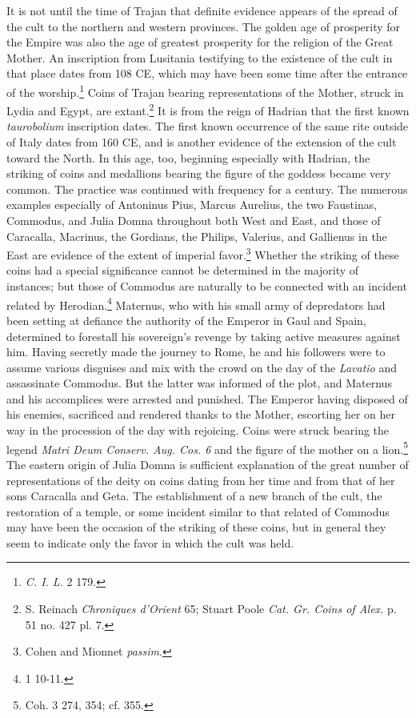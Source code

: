 \documentclass[a4paper, 11pt, oneside, polutonikogreek, english]{article}
\begin{document}
It is not until the time of Trajan that definite evidence appears of the spread of the cult to the northern and western provinces. The golden age of prosperity for the Empire was also the age of greatest prosperity for the religion of the Great Mother. An inscription from Lusitania testifying to the existence of the cult in that place dates from 108 \textsc{CE}, which may have been some time after the entrance of the worship.\footnote{\emph{C. I. L.} 2 179.} Coins of Trajan bearing representations of the Mother, struck in Lydia and Egypt, are extant.\footnote{S. Reinach \emph{Chroniques d'Orient} 65; Stuart Poole \emph{Cat. Gr. Coins of Alex.} p. 51 no. 427 pl. 7.} It is from the reign of Hadrian that the first known \emph{taurobolium} inscription dates. The first known occurrence of the same rite outside of Italy dates from 160 \textsc{CE}, and is another evidence of the extension of the cult toward the North. In this age, too, beginning especially with Hadrian, the striking of coins and medallions bearing the figure of the goddess became very common. The practice was continued with frequency for a century. The numerous examples especially of Antoninus Pius, Marcus Aurelius, the two Faustinas, Commodus, and Julia Domna throughout both West and East, and those of Caracalla, Macrinus, the Gordians, the Philips, Valerius, and Gallienus in the East are evidence of the extent of imperial favor.\footnote{Cohen and Mionnet \emph{passim}.} Whether the striking of these coins had a special significance cannot be determined in the majority of instances; but those of Commodus are naturally to be connected with an incident related by Herodian.\footnote{1 10-11.} Maternus, who with his small army of depredators had been setting at defiance the authority of the Emperor in Gaul and Spain, determined to forestall his sovereign's revenge by taking active measures against him. Having secretly made the journey to Rome, he and his followers were to assume various disguises and mix with the crowd on the day of the \emph{Lavatio} and assassinate Commodus. But the latter was informed of the plot, and Maternus and his accomplices were arrested and punished. The Emperor having disposed of his enemies, sacrificed and rendered thanks to the Mother, escorting her on her way in the procession of the day with rejoicing. Coins were struck bearing the legend \emph{Matri Deum Conserv. Aug. Cos. 6} and the figure of the mother on a lion.\footnote{Coh. 3 274, 354; cf. 355.} The eastern origin of Julia Domna is sufficient explanation of the great number of representations of the deity on coins dating from her time and from that of her sons Caracalla and Geta. The establishment of a new branch of the cult, the restoration of a temple, or some incident similar to that related of Commodus may have been the occasion of the striking of these coins, but in general they seem to indicate only the favor in which the cult was held.
\end{document}
